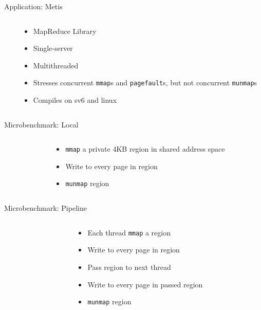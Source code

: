 \documentclass[aspectratio=169]{beamer}
\newcommand{\bi}{\begin{itemize}}
\newcommand{\ei}{\end{itemize}}
\begin{document}
\begin{frame}{Application: Metis}
  \begin{columns}[T]
    \begin{column}{0.5\textwidth}
      
    \end{column}
    \begin{column}{0.5\textwidth}
      \bi
    \item MapReduce Library
    \item Single-server
    \item Multithreaded
    \item Stresses concurrent \texttt{mmap}s and \texttt{pagefault}s, but not concurrent \texttt{munmap}s
    \item Compiles on sv6 and linux
      \ei
    \end{column}
  \end{columns}
\end{frame}

\begin{frame}{Microbenchmark: Local}
  \begin{columns}[T]
    \begin{column}{0.5\textwidth}
      
    \end{column}
    \begin{column}{0.5\textwidth}
      \bi
    \item \texttt{mmap} a private 4KB region in shared address space
    \item Write to every page in region
    \item \texttt{munmap} region
      \ei
    \end{column}
  \end{columns}
\end{frame}

\begin{frame}{Microbenchmark: Pipeline}
  \begin{columns}[T]
    \begin{column}{0.5\textwidth}
      
    \end{column}
    \begin{column}{0.5\textwidth}
      \bi
    \item Each thread \texttt{mmap} a region
    \item Write to every page in region
    \item Pass region to next thread
    \item Write to every page in passed region
    \item \texttt{munmap} region
      \ei
    \end{column}
  \end{columns}
\end{frame}
\end{document}
